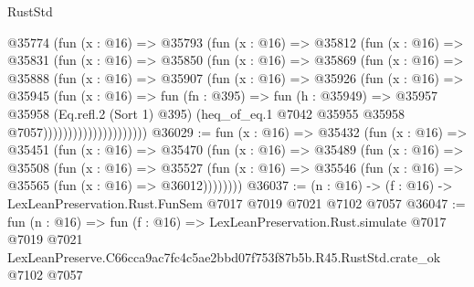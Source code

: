 \begin{lexlean}{RustStd}
\begin{coremodule}
                      @35774
                        (fun (x : @16) =>
                        @35793
                          (fun (x : @16) =>
                          @35812
                            (fun (x : @16) =>
                            @35831
                              (fun (x : @16) =>
                              @35850
                                (fun (x : @16) =>
                                @35869
                                  (fun (x : @16) =>
                                  @35888
                                    (fun (x : @16) =>
                                    @35907
                                      (fun (x : @16) =>
                                      @35926
                                        (fun (x : @16) =>
                                        @35945
                                          (fun (x : @16) =>
                                          fun (fn : @395) =>
                                          fun (h : @35949) =>
                                          @35957
                                            @35958
                                            (Eq.refl.{2} (Sort 1) @395)
                                            (heq_of_eq.{1}
                                              @7042
                                              @35955
                                              @35958
                                              @7057)))))))))))))))))))))
@36029 := fun (x : @16) =>
  @35432
    (fun (x : @16) =>
    @35451
      (fun (x : @16) =>
      @35470
        (fun (x : @16) =>
        @35489
          (fun (x : @16) =>
          @35508
            (fun (x : @16) =>
            @35527
              (fun (x : @16) => @35546 (fun (x : @16) => @35565 (fun (x : @16) => @36012))))))))
@36037 := (n : @16) -> (f : @16) -> LexLeanPreservation.Rust.FunSem @7017 @7019 @7021 @7102 @7057
@36047 := fun (n : @16) =>
  fun (f : @16) =>
  LexLeanPreservation.Rust.simulate
    @7017
    @7019
    @7021
    LexLeanPreserve.C66cca9ac7fc4c5ae2bbd07f753f87b5b.R45.RustStd.crate_ok
    @7102
    @7057
\end{coremodule}
\end{lexlean}
